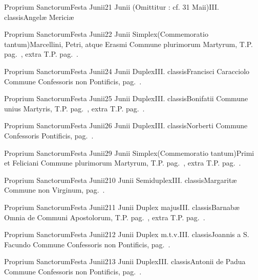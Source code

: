 \documentclass[nocturnale-romanum.tex]{subfiles}
\begin{document}

	{Proprium Sanctorum}{Festa Junii}{2}{1 Junii}
	{(Omittitur : cf. 31 Maii)}{III. classis}{Angelæ Mericiæ}
	{}
	{}

	{Proprium Sanctorum}{Festa Junii}{2}{2 Junii}
	{Simplex}{(Commemoratio tantum)}{Marcellini, Petri, atque Erasmi}
	{Commune plurimorum Martyrum, T.P. pag.\ \pageref{M-MRTP}, extra T.P. pag.\ \pageref{M-PMEX}.}
	{}

	{Proprium Sanctorum}{Festa Junii}{2}{4 Junii}
	{Duplex}{III. classis}{Francisci Caracciolo}
	{Commune Confessoris non Pontificis, pag.\ \pageref{M-CONP}.}
	{}

	{Proprium Sanctorum}{Festa Junii}{2}{5 Junii}
	{Duplex}{III. classis}{Bonifatii}
	{Commune unius Martyris, T.P. pag.\ \pageref{M-MRTP}, extra T.P. pag.\ \pageref{M-UMEX}.}
	{}

	{Proprium Sanctorum}{Festa Junii}{2}{6 Junii}
	{Duplex}{III. classis}{Norberti}
	{Commune Confessoris Pontificis, pag.\ \pageref{M-COPO}.}
	{}

	{Proprium Sanctorum}{Festa Junii}{2}{9 Junii}
	{Simplex}{(Commemoratio tantum)}{Primi et Feliciani}
	{Commune plurimorum Martyrum, T.P. pag.\ \pageref{M-MRTP}, extra T.P. pag.\ \pageref{M-PMEX}.}
	{}

	{Proprium Sanctorum}{Festa Junii}{2}{10 Junii}
	{Semiduplex}{III. classis}{Margaritæ}
	{Commune non Virginum, pag.\ \pageref{M-MU}.}
	{}

	{Proprium Sanctorum}{Festa Junii}{2}{11 Junii}
	{Duplex majus}{III. classis}{Barnabæ}
	{Omnia de Communi Apostolorum, T.P. pag.\ \pageref{M-APTP}, extra T.P. pag.\ \pageref{M-APEX}.}
	{}

	{Proprium Sanctorum}{Festa Junii}{2}{12 Junii}
	{Duplex m.t.v.}{III. classis}{Joannis a S. Facundo}
	{Commune Confessoris non Pontificis, pag.\ \pageref{M-CONP}.}
	{}

	{Proprium Sanctorum}{Festa Junii}{2}{13 Junii}
	{Duplex}{III. classis}{Antonii de Padua}
	{Commune Confessoris non Pontificis, pag.\ \pageref{M-CONP}.}
	{}
\end{document}
